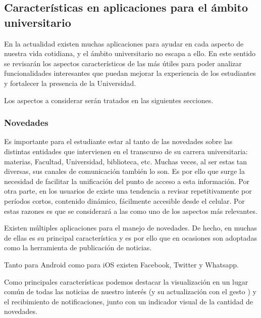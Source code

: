 \subsection{Características en aplicaciones para el ámbito universitario}
\label{aplicaciones_utiles_existentes}

En la actualidad existen muchas aplicaciones para ayudar en cada aspecto de
nuestra vida cotidiana, y el ámbito universitario no escapa a ello. En este sentido se
revisarán los aspectos característicos de las más útiles\cite{StudentApps} para poder analizar funcionalidades interesantes que puedan mejorar la experiencia de los estudiantes y fortalecer la presencia de la Universidad.

Los aspectos a considerar serán tratados en las siguientes secciones.

\subsubsection{Novedades}
\label{aplicaciones_utiles_existentes_novedades}

Es importante para el estudiante estar al tanto de las novedades sobre las distintas entidades que intervienen en el transcurso de su carrera universitaria: materias, Facultad, Universidad, biblioteca, etc.
Muchas veces, al ser estas tan diversas, sus canales de comunicación también lo son.
Es por ello que surge la necesidad de facilitar la unificación del punto de acceso a esta información.
Por otra parte, en los usuarios de  existe una tendencia a revisar repetitivamente por períodos cortos, contenido dinámico, fácilmente accesible desde el celular\cite{oulasvirta2012habits}. Por estas razones es que se considerará a las  como uno de los aspectos más relevantes.

Existen múltiples aplicaciones para el manejo de novedades. De hecho, en muchas de ellas es su principal característica y es por ello que en ocasiones son adoptadas como la herramienta de publicación de noticias.

Tanto para Android como para iOS existen Facebook, Twitter y Whatsapp.


Como principales características podemos destacar la visualización en un lugar común de todas las noticias de nuestro interés (y su actualización con el gesto ) y el recibimiento de notificaciones, junto con un indicador visual de la cantidad de novedades.

